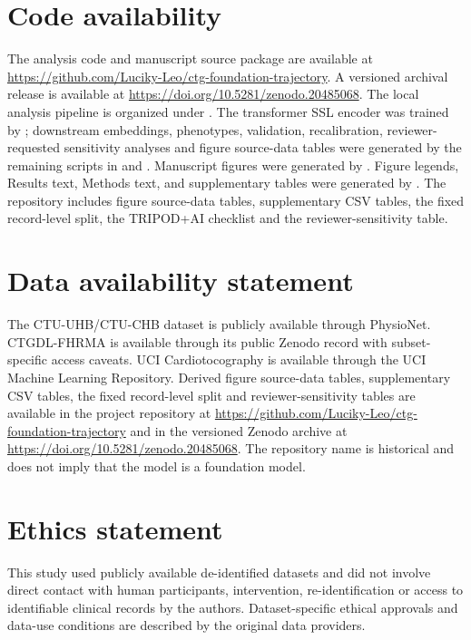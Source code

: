 \documentclass[11pt]{article}
\begin{document}
\section{Code availability}

The analysis code and manuscript source package are available at \url{https://github.com/Luciky-Leo/ctg-foundation-trajectory}. A versioned archival release is available at \url{https://doi.org/10.5281/zenodo.20485068}. The local analysis pipeline is organized under . The transformer SSL encoder was trained by ; downstream embeddings, phenotypes, validation, recalibration, reviewer-requested sensitivity analyses and figure source-data tables were generated by the remaining scripts in  and . Manuscript figures were generated by . Figure legends, Results text, Methods text, and supplementary tables were generated by . The repository includes figure source-data tables, supplementary CSV tables, the fixed record-level split, the TRIPOD+AI checklist and the reviewer-sensitivity table.

        \section*{Data availability statement}
The CTU-UHB/CTU-CHB dataset is publicly available through PhysioNet. CTGDL-FHRMA is available through its public Zenodo record with subset-specific access caveats. UCI Cardiotocography is available through the UCI Machine Learning Repository. Derived figure source-data tables, supplementary CSV tables, the fixed record-level split and reviewer-sensitivity tables are available in the project repository at \url{https://github.com/Luciky-Leo/ctg-foundation-trajectory} and in the versioned Zenodo archive at \url{https://doi.org/10.5281/zenodo.20485068}. The repository name is historical and does not imply that the model is a foundation model.

\section*{Ethics statement}
This study used publicly available de-identified datasets and did not involve direct contact with human participants, intervention, re-identification or access to identifiable clinical records by the authors. Dataset-specific ethical approvals and data-use conditions are described by the original data providers.
\end{document}
